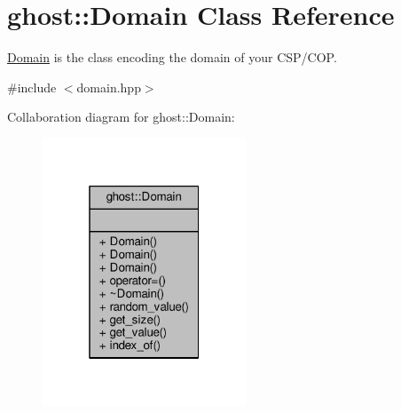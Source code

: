 \hypertarget{classghost_1_1Domain}{\section{ghost\-:\-:Domain Class Reference}
\label{classghost_1_1Domain}
}


\hyperlink{classghost_1_1Domain}{Domain} is the class encoding the domain of your C\-S\-P/\-C\-O\-P.  




{\ttfamily \#include $<$domain.\-hpp$>$}



Collaboration diagram for ghost\-:\-:Domain\-:
\nopagebreak
\begin{figure}[H]
\begin{center}
\leavevmode
\includegraphics[width=172pt]{classghost_1_1Domain__coll__graph}
\end{center}
\end{figure}
